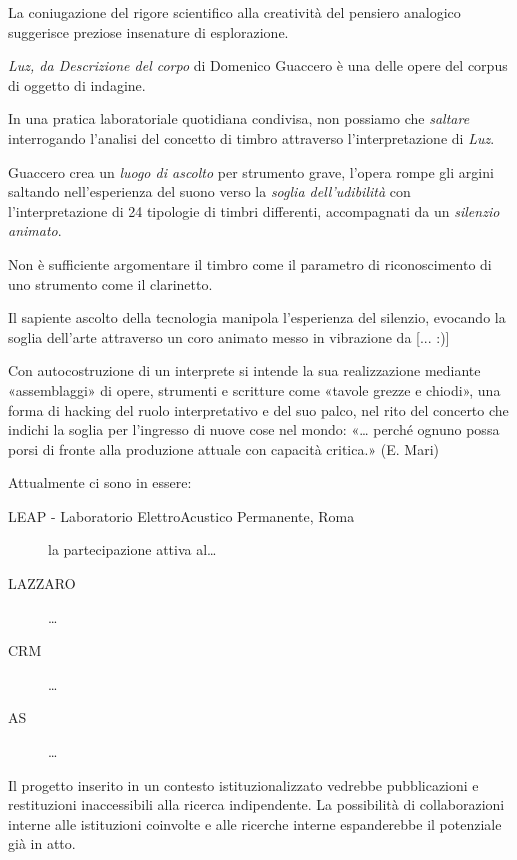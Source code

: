 \documentclass{gs-adonis}
\begin{document}
La coniugazione del rigore scientifico alla creatività del pensiero analogico
suggerisce preziose insenature di esplorazione.

\emph{Luz, da Descrizione del corpo} di Domenico Guaccero è una delle opere del
corpus di oggetto di indagine.

In una pratica laboratoriale quotidiana condivisa, non possiamo che
\emph{saltare} interrogando l'analisi del concetto di timbro attraverso
l'interpretazione di \emph{Luz}.

Guaccero crea un \emph{luogo di ascolto} per strumento grave, l'opera rompe
gli argini saltando nell'esperienza del suono verso la
\emph{soglia dell'udibilità} con l'interpretazione di 24 tipologie di timbri
differenti, accompagnati da un \emph{silenzio animato}.

Non è sufficiente argomentare il timbro come il parametro di riconoscimento di
uno strumento come il clarinetto.

Il sapiente ascolto della tecnologia manipola l'esperienza del silenzio,
evocando la soglia dell'arte attraverso un coro animato messo in vibrazione da
[... :)]

Con autocostruzione di un interprete si intende la sua realizzazione mediante
«assemblaggi» di opere, strumenti e scritture come «tavole grezze e chiodi»,
una forma di hacking del ruolo interpretativo e del suo palco, nel rito del
concerto che indichi la soglia per l'ingresso di nuove cose nel mondo:
«… perché ognuno possa porsi di fronte alla produzione
attuale con capacità critica.» (E. Mari)


Attualmente ci sono in essere:

\begin{description}
  \item[LEAP - Laboratorio ElettroAcustico Permanente, Roma] la partecipazione
  attiva al…
  \item[LAZZARO] …
  \item[CRM] …
  \item[AS] …
\end{description}

Il progetto inserito in un contesto istituzionalizzato vedrebbe pubblicazioni
e restituzioni inaccessibili alla ricerca indipendente. La possibilità di
collaborazioni interne alle istituzioni coinvolte e alle ricerche interne
espanderebbe il potenziale già in atto.
\end{document}
